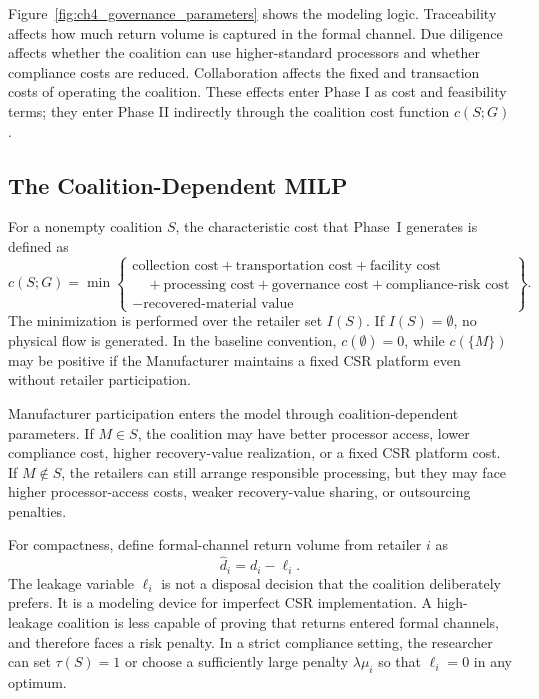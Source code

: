 Figure~\ref{fig:ch4_governance_parameters} shows the modeling logic. Traceability affects how much return volume is captured in the formal channel. Due diligence affects whether the coalition can use higher-standard processors and whether compliance costs are reduced. Collaboration affects the fixed and transaction costs of operating the coalition. These effects enter Phase I as cost and feasibility terms; they enter Phase II indirectly through the coalition cost function $c(S;G)$.

\subsection{The Coalition-Dependent MILP}

For a nonempty coalition $S$, the characteristic cost that Phase~I generates is defined as
\begin{equation}
\label{eq:ch4_characteristic_cost}
c(S;G)=
\min
\left\{
\begin{array}{l}
\text{collection cost}
+\text{transportation cost}
+\text{facility cost}\\
\quad+\text{processing cost}
+\text{governance cost}
+\text{compliance-risk cost}\\
-\text{recovered-material value}
\end{array}
\right\}.
\end{equation}
The minimization is performed over the retailer set $I(S)$. If $I(S)=\emptyset$, no physical flow is generated. In the baseline convention, $c(\emptyset)=0$, while $c(\{M\})$ may be positive if the Manufacturer maintains a fixed CSR platform even without retailer participation.

Manufacturer participation enters the model through coalition-dependent parameters. If $M\in S$, the coalition may have better processor access, lower compliance cost, higher recovery-value realization, or a fixed CSR platform cost. If $M\notin S$, the retailers can still arrange responsible processing, but they may face higher processor-access costs, weaker recovery-value sharing, or outsourcing penalties.

For compactness, define formal-channel return volume from retailer $i$ as
\begin{equation}
\label{eq:ch4_formal_volume}
\widehat d_i=d_i-\ell_i.
\end{equation}
The leakage variable $\ell_i$ is not a disposal decision that the coalition deliberately prefers. It is a modeling device for imperfect CSR implementation. A high-leakage coalition is less capable of proving that returns entered formal channels, and therefore faces a risk penalty. In a strict compliance setting, the researcher can set $\tau(S)=1$ or choose a sufficiently large penalty $\lambda\mu_i$ so that $\ell_i=0$ in any optimum.

